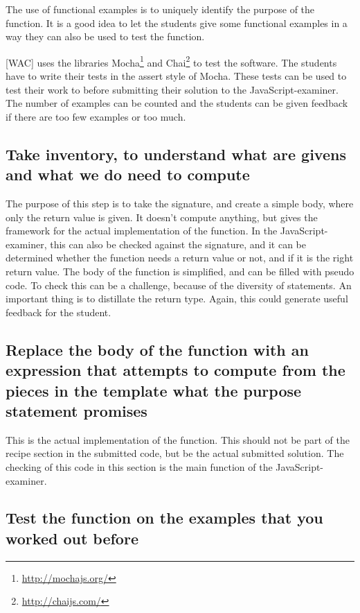 \documentclass{article}
\begin{document}
The use of functional examples is to uniquely identify the purpose of the
function.
It is a good idea to let the students give some functional examples in a way
they can also be used to test the function.

[WAC] uses the libraries Mocha\footnote{\url{http://mochajs.org/}} and
Chai\footnote{\url{http://chaijs.com/}} to test the software.
The students have to write their tests in the assert style of Mocha.
These tests can be used to test their work to before submitting their solution
to the JavaScript-examiner.
The number of examples can be counted and the students can be given feedback if
there are too few examples or too much.


\subsection{Take inventory, to understand what are givens and what we do need to compute}

The purpose of this step is to take the signature, and create a simple body,
where only the return value is given.
It doesn't compute anything, but gives the framework for the actual
implementation of the function.
In the JavaScript-examiner, this can also be checked against the signature, and
it can be determined whether the function needs a return value or not, and if it
is the right return value. The body of the function is simplified, and can be
filled with pseudo code.
To check this can be a challenge, because of the diversity of statements. An
important thing is to distillate the return type.
Again, this could generate useful feedback for the student.


\subsection{Replace the body of the function with an expression that attempts to compute from the pieces in the template what the purpose statement promises}

This is the actual implementation of the function.
This should not be part of the recipe section in the submitted code, but be the
actual submitted solution.
The checking of this code in this section is the main function of the
JavaScript-examiner.


\subsection{Test the function on the examples that you worked out before}
\end{document}
